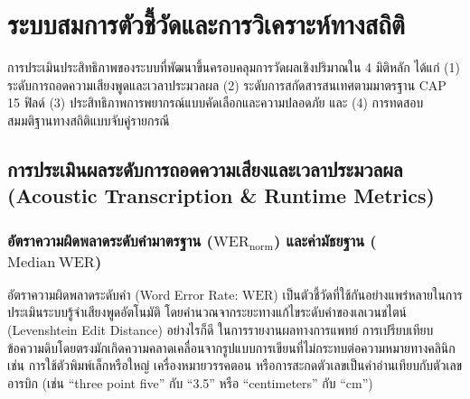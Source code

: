 \section{ระบบสมการตัวชี้วัดและการวิเคราะห์ทางสถิติ}
\label{sec:metrics}

การประเมินประสิทธิภาพของระบบที่พัฒนาขึ้นครอบคลุมการวัดผลเชิงปริมาณใน 4 มิติหลัก ได้แก่ (1) ระดับการถอดความเสียงพูดและเวลาประมวลผล (2) ระดับการสกัดสารสนเทศตามมาตรฐาน CAP 15 ฟิลด์ (3) ประสิทธิภาพการพยากรณ์แบบคัดเลือกและความปลอดภัย และ (4) การทดสอบสมมติฐานทางสถิติแบบจับคู่รายกรณี

\subsection{การประเมินผลระดับการถอดความเสียงและเวลาประมวลผล (Acoustic Transcription \& Runtime Metrics)}

\subsubsection{อัตราความผิดพลาดระดับคำมาตรฐาน ($\mathrm{WER}_{\mathrm{norm}}$) และค่ามัธยฐาน ($\mathrm{Median\ WER}$)}

อัตราความผิดพลาดระดับคำ (Word Error Rate: $\mathrm{WER}$) เป็นตัวชี้วัดที่ใช้กันอย่างแพร่หลายในการประเมินระบบรู้จำเสียงพูดอัตโนมัติ \cite{radford2023whisper,zhou2018errors} โดยคำนวณจากระยะทางแก้ไขระดับคำของเลเวนชไตน์ (Levenshtein Edit Distance) อย่างไรก็ดี ในการรายงานผลทางการแพทย์ การเปรียบเทียบข้อความดิบโดยตรงมักเกิดความคลาดเคลื่อนจากรูปแบบการเขียนที่ไม่กระทบต่อความหมายทางคลินิก เช่น การใช้ตัวพิมพ์เล็กหรือใหญ่ เครื่องหมายวรรคตอน หรือการสะกดตัวเลขเป็นคำอ่านเทียบกับตัวเลขอารบิก (เช่น ``three point five'' กับ ``3.5'' หรือ ``centimeters'' กับ ``cm'')

